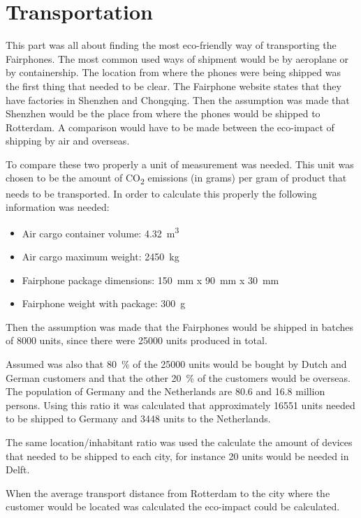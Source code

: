 \documentclass[final]{report} %
\begin{document}
\chapter{Transportation} %
\label{ch:transportation}

This part was all about finding the most eco-friendly way of transporting the Fairphones.
The most common used ways of shipment would be by aeroplane or by containership.
The location from where the phones were being shipped was the first thing that needed to be clear. 
The Fairphone website states that they have factories in Shenzhen and Chongqing. 
Then the assumption was made that Shenzhen would be the place from where the phones would be shipped to Rotterdam. 
A comparison would have to be made between the eco-impact of shipping by air and overseas.  

To compare these two properly a unit of measurement was needed.
This unit was chosen to be the amount of CO\textsubscript{2} emissions (in grams) per gram of product that needs to be transported.
In order to calculate this properly the following information was needed:

\begin{itemize}
\item Air cargo container volume: \SI{4.32}{\cubic\meter}
\item Air cargo maximum weight: \SI{2450}{\kilo\gram}
\item Fairphone package dimensions: \SI{150}{\milli\meter} x \SI{90}{\milli\meter} x \SI{30}{\milli\meter}
\item Fairphone weight with package: \SI{300}{\gram}
\end{itemize}
Then the assumption was made that the Fairphones would be shipped in batches of \num{8000} units, since there were \num{25000} units produced in total.

Assumed was also that \SI{80}{\percent} of the \num{25000} units would be bought by Dutch and German customers and that the other \SI{20}{\percent} of the customers would be overseas.
The population of Germany and the Netherlands are \num{80.6} and \num{16.8} million persons.
Using this ratio it was calculated that approximately \num{16551} units needed to be shipped to Germany and \num{3448} units to the Netherlands. 

The same location/inhabitant ratio was used the calculate the amount of devices that needed to be shipped to each city, for instance \num{20} units would be needed in Delft.

When the average transport distance from Rotterdam to the city where the customer would be located was calculated the eco-impact could be calculated.
 
\end{document}
